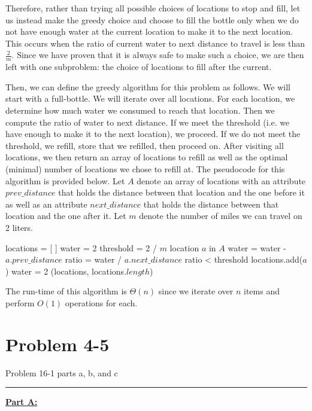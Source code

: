 \documentclass[11pt]{article}
\def\separateline{\medskip\hrule\medskip}
\begin{document}
Therefore, rather than trying all possible choices of locations to stop and fill, let us instead make the greedy choice and choose to fill the bottle only when we do not have enough water at the current location to make it to the next location. This occurs when the ratio of current water to next distance to travel is less than $\frac{2}{m}$. Since we have proven that it is always safe to make such a choice, we are then left with one subproblem: the choice of locations to fill after the current.

Then, we can define the greedy algorithm for this problem as follows. We will start with a full-bottle. We will iterate over all locations. For each location, we determine how much water we consumed to reach that location. Then we compute the ratio of water to next distance. If we meet the threshold (i.e. we have enough to make it to the next location), we proceed. If we do not meet the threshold, we refill, store that we refilled, then proceed on. After visiting all locations, we then return an array of locations to refill as well as the optimal (minimal) number of locations we chose to refill at. The pseudocode for this algorithm is provided below. Let $A$ denote an array of locations with an attribute $prev\_distance$ that holds the distance between that location and the one before it as well as an attribute $next\_distance$ that holds the distance between that location and the one after it. Let $m$ denote the number of miles we can travel on 2 liters.

\begin{codebox}
\li locations = [ ]
\li water = 2
\li threshold = 2 / $m$
\li \For location $a$ in $A$ \Do
\li     water = water - $a.prev\_distance$
\li     ratio = water / $a.next\_distance$
\li     \If ratio < threshold \Then
\li         locations.add($a$)
\li         water = 2
        \End
    \End
\li \Return (locations, locations$.length$)
\end{codebox}

The run-time of this algorithm is $\Theta(n)$ since we iterate over $n$ items and perform $O(1)$ operations for each.

\newpage

\section{Problem 4-5}
Problem 16-1 parts a, b, and c
\separateline

\underline{\textbf{Part A:}}
\end{document}
